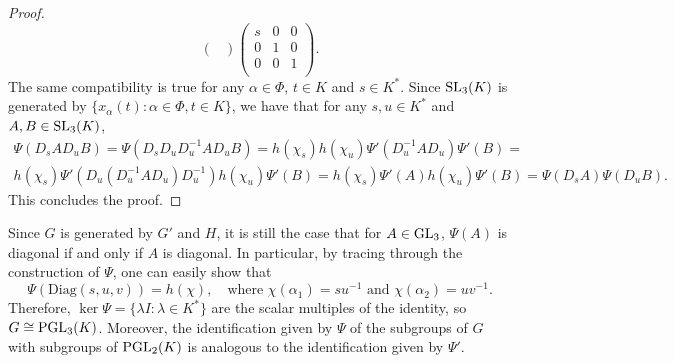 \begin{proof}
$$\begin{pmatrix}
    \end{pmatrix}\begin{pmatrix}
        s & 0 & 0\\
        0 & 1 & 0\\
        0 & 0 & 1\\
    \end{pmatrix}.$$
    The same compatibility is true for any $\alpha\in\Phi$, $t\in K$ and $s\in K^*$. Since $\mathrm{SL}_3(K)$ is generated by $\{x_\alpha(t):\alpha\in\Phi, t\in K\}$, we have that for any $s,u\in K^*$ and $A,B\in\mathrm{SL}_3(K)$,
    \begin{align*}
        \Psi(D_sAD_uB)=\Psi(D_sD_uD_u^{-1}AD_uB)=h(\chi_{s})h(\chi_u)\Psi'(D_u^{-1}AD_u)\Psi'(B)=\\
        h(\chi_s)\Psi'(D_u(D_u^{-1}AD_u)D_u^{-1})h(\chi_u)\Psi'(B)=h(\chi_s)\Psi'(A)h(\chi_u)\Psi'(B)=\Psi(D_sA)\Psi(D_uB).
    \end{align*}
    This concludes the proof.
\end{proof}

Since $G$ is generated by $G'$ and $H$, it is still the case that for $A\in\mathrm{GL}_3$, $\Psi(A)$ is diagonal if and only if $A$ is diagonal. In particular, by tracing through the construction of $\Psi$, one can easily show that 
$$\Psi(\mathrm{Diag}(s,u,v))=h(\chi),\quad\text{where }\chi(\alpha_1)=su^{-1}\text{ and }\chi(\alpha_2)=uv^{-1}.$$
Therefore, $\ker\Psi=\{\lambda I:\lambda\in K^*\}$ are the scalar multiples of the identity, so $G\cong\mathrm{PGL}_3(K)$. Moreover, the identification given by $\Psi$ of the subgroups of $G$ with subgroups of $\mathrm{PGL}_2(K)$ is analogous to the identification given by $\Psi'$.

